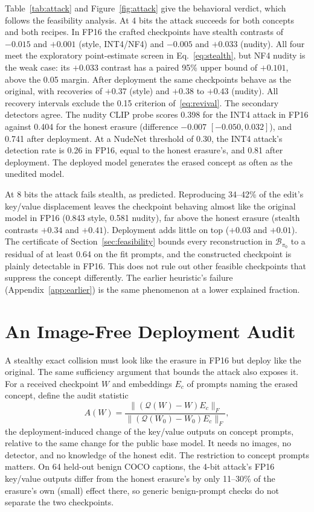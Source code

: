 \documentclass[conference]{IEEEtran}
\begin{document}
Table~\ref{tab:attack} and Figure~\ref{fig:attack} give the behavioral verdict, which follows the feasibility
analysis. At 4 bits the attack succeeds for both concepts and both recipes.
In FP16 the crafted checkpoints have stealth contrasts of $-0.015$ and $+0.001$
(style, INT4/NF4) and $-0.005$ and $+0.033$ (nudity). All four meet the exploratory
point-estimate screen in Eq.~\eqref{eq:stealth}, but NF4 nudity is the weak case:
its $+0.033$ contrast has a paired 95\% upper bound of $+0.101$, above the 0.05
margin. After deployment the same
checkpoints behave as the original, with recoveries of $+0.37$ (style) and $+0.38$ to
$+0.43$ (nudity). All recovery intervals exclude the 0.15 criterion
of~\eqref{eq:revival}. The secondary detectors agree. The nudity CLIP probe scores
0.398 for the INT4 attack in FP16 against 0.404 for the honest erasure (difference
$-0.007$ $[-0.050,0.032]$), and 0.741 after deployment. At a NudeNet threshold of 0.30,
the INT4 attack's detection rate is 0.26 in FP16, equal to the honest erasure's, and
0.81 after deployment. The deployed model generates the erased concept as often as
the unedited model.

At 8 bits the attack fails stealth, as predicted. Reproducing 34--42\% of the
edit's key/value displacement leaves the checkpoint behaving almost like the original
model in FP16 (0.843 style, 0.581 nudity), far above the honest erasure (stealth
contrasts $+0.34$ and $+0.41$). Deployment adds little on top ($+0.03$ and $+0.01$).
The certificate of Section~\ref{sec:feasibility} bounds every reconstruction in
$\mathcal{B}_{\pi_0}$ to a residual of at least 0.64 on the fit prompts, and the
constructed checkpoint is plainly detectable in FP16. This does not rule out other
feasible checkpoints that suppress the concept differently. The earlier heuristic's failure (Appendix~\ref{app:earlier}) is
the same phenomenon at a lower explained fraction.
\section{An Image-Free Deployment Audit}
\label{sec:audit}
A stealthy exact collision must look like the erasure in FP16 but deploy like the
original. The same sufficiency argument that bounds the attack also exposes it. For a
received checkpoint $W$ and embeddings $E_c$ of prompts naming the erased concept,
define the audit statistic
\begin{equation}
 A(W)=\frac{\|(\mathcal{Q}(W)-W)E_c\|_F}{\|(\mathcal{Q}(W_0)-W_0)E_c\|_F},
 \label{eq:audit}
\end{equation}
the deployment-induced change of the key/value outputs on concept prompts, relative
to the same change for the public base model. It needs no images, no detector, and
no knowledge of the honest edit. The restriction to concept prompts matters. On 64
held-out benign COCO captions, the 4-bit attack's FP16 key/value outputs differ from
the honest erasure's by only 11--30\% of the erasure's own (small) effect there, so
generic benign-prompt checks do not separate the two checkpoints.
\end{document}
